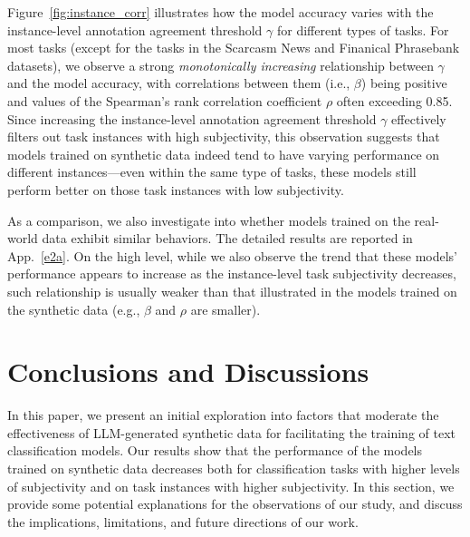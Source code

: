 Figure~\ref{fig:instance_corr} illustrates how the model accuracy varies with the instance-level annotation agreement threshold $\gamma$ for different types of tasks. For most tasks (except for the tasks in the Scarcasm News and Finanical Phrasebank datasets), we observe a strong {\em monotonically increasing} relationship between $\gamma$ and the model accuracy, with correlations between them (i.e., $\beta$) being positive and  values of the Spearman's rank correlation coefficient $\rho$ often exceeding 0.85. Since increasing the instance-level annotation agreement threshold $\gamma$ effectively filters out task instances with high subjectivity, this observation suggests that models trained on synthetic data indeed tend to have varying performance on different instances---even within the same type of tasks, these models still perform better on those task instances with low subjectivity.  

As a comparison, we also investigate into whether models trained on the real-world data exhibit similar behaviors. The detailed results are reported in App.~\ref{e2a}. On the high level, while we also observe the trend that these models' performance appears to increase as the instance-level task subjectivity decreases, such relationship is usually weaker than that illustrated in the models trained on the synthetic data (e.g., $\beta$ and $\rho$ are smaller). 

\vspace{-8pt}

\section{Conclusions and Discussions}
\vspace{-4pt}
In this paper, we present an initial exploration into factors that moderate the effectiveness of LLM-generated synthetic data for facilitating the training of text classification models.  
Our results show that the performance of the models trained on synthetic data decreases both for classification tasks with higher levels of subjectivity and on task instances with higher subjectivity. In this section, we provide some potential explanations for the observations of our study, and discuss the implications, limitations, and future directions of our work.
\vspace{-2pt}
